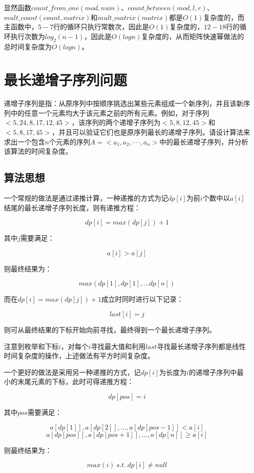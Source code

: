 \documentclass{article}
\begin{document}
显然函数$count\_from\_one(mod,num)$、$count\_between(mod,l,r)$、$mult\_count(count,matrix)$和$mult\_matrix(matrix)$都是$O(1)$复杂度的，而主函数中，$5-7$行的循环只执行常数次，因此是$O(1)$复杂度的，$12-18$行的循环执行次数为$log_2(n-1)$，因此是$O(log n)$复杂度的，从而矩阵快速幂做法的总时间复杂度为$O(log n)$。

\section{最长递增子序列问题}

递增子序列是指：从原序列中按顺序挑选出某些元素组成一个新序列，并且该新序列中的任意一个元素均大于该元素之前的所有元素。例如，对于序列$<5,24,8,17,12,45>$，该序列的两个递增子序列为$<5,8,12,45>$和$<5,8,17,45>$，并且可以验证它们也是原序列最长的递增子序列。请设计算法来求出一个包含$n$个元素的序列$A=<a_1,a_2,···,a_n>$中的最长递增子序列，并分析该算法的时间复杂度。

\subsection{算法思想}

一个常规的做法是通过递推计算，一种递推的方式为记$dp[i]$为前$i$个数中以$a[i]$结尾的最长递增子序列长度，则有递推方程：

$$
dp[i]=max(dp[j])+1
$$

其中$j$需要满足：

$$
a[i]>a[j]
$$

则最终结果为：

$$
max(dp[1],dp[1],...dp[n])
$$

而在$dp[i]=max(dp[j])+1$成立时同时进行以下记录：

$$
last[i]=j
$$

则可从最终结果的下标开始向前寻找，最终得到一个最长递增子序列。

注意到枚举和下标$i$，对每个$i$寻找最大值和利用$last$寻找最长递增子序列都是线性时间复杂度的操作，上述做法有平方时间复杂度。

一个更好的做法是采用另一种递推的方式，记$dp[i]$为长度为$i$的递增子序列中最小的末尾元素的下标，此时可得递推方程：

$$
dp[pos]=i
$$

其中$pos$需要满足：

$$
a[dp[1]],a[dp[2]],...,a[dp[pos-1]]<a[i]
$$
$$
a[dp[pos]],a[dp[pos+1]],...,a[dp[n]]\ge{a}[i]
$$

则最终结果为：

$$
max(i)\ s.t.\ dp[i]\ne{null}
$$
\end{document}
